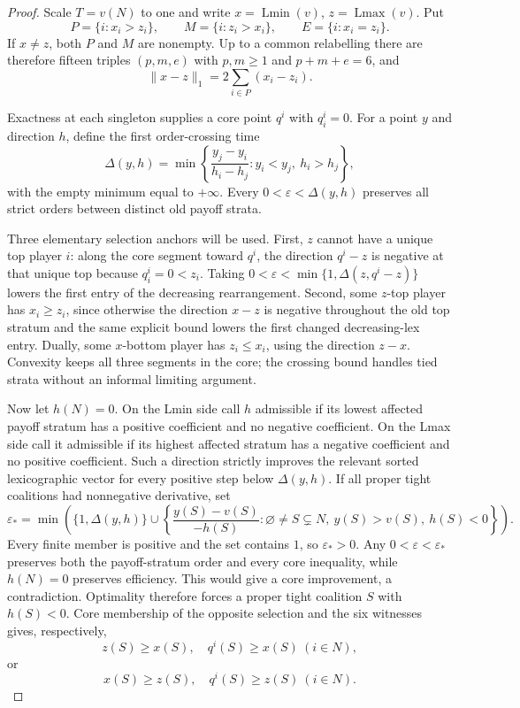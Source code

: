 \documentclass[11pt]{article}
\newcommand{\Lmin}{\operatorname{Lmin}}
\newcommand{\Lmax}{\operatorname{Lmax}}
\begin{document}
\begin{proof}
Scale $T=v(N)$ to one and write $x=\Lmin(v)$, $z=\Lmax(v)$.  Put
\[
 P=\{i:x_i>z_i\},\qquad M=\{i:z_i>x_i\},\qquad E=\{i:x_i=z_i\}.
\]
If $x\ne z$, both $P$ and $M$ are nonempty.  Up to a common relabelling
there are therefore fifteen triples $(p,m,e)$ with $p,m\ge1$ and
$p+m+e=6$, and
\[
 \|x-z\|_1=2\sum_{i\in P}(x_i-z_i).                    \tag{28}
\]

Exactness at each singleton supplies a core point $q^i$ with $q^i_i=0$.
For a point $y$ and direction $h$, define the first order-crossing time
\[
 \Delta(y,h)=\min\left\{\frac{y_j-y_i}{h_i-h_j}:
 y_i<y_j,\ h_i>h_j\right\},
\]
with the empty minimum equal to $+\infty$.  Every
$0<\varepsilon<\Delta(y,h)$ preserves all strict orders between distinct old
payoff strata.

Three elementary selection anchors will be used.  First, $z$ cannot have a
unique top player $i$: along the core segment toward $q^i$, the direction
$q^i-z$ is negative at that unique top because $q^i_i=0<z_i$.  Taking
$0<\varepsilon<\min\{1,\Delta(z,q^i-z)\}$ lowers the first entry of the
decreasing rearrangement.  Second, some $z$-top player has $x_i\ge z_i$,
since otherwise the direction $x-z$ is negative throughout the old top
stratum and the same explicit bound lowers the first changed decreasing-lex
entry.  Dually, some $x$-bottom player has $z_i\le x_i$, using the direction
$z-x$.  Convexity keeps all three segments in the core; the crossing bound
handles tied strata without an informal limiting argument.

Now let $h(N)=0$.  On the Lmin side call $h$ admissible if its lowest affected
payoff stratum has a positive coefficient and no negative coefficient.  On
the Lmax side call it admissible if its highest affected stratum has a
negative coefficient and no positive coefficient.  Such a direction strictly
improves the relevant sorted lexicographic vector for every positive step
below $\Delta(y,h)$.  If all proper tight coalitions had nonnegative
derivative, set
\[
 \varepsilon_*=\min\left(\{1,\Delta(y,h)\}\cup
 \left\{\frac{y(S)-v(S)}{-h(S)}:
 \varnothing\ne S\subsetneq N,\ y(S)>v(S),\ h(S)<0\right\}\right).
\]
Every finite member is positive and the set contains $1$, so
$\varepsilon_*>0$.  Any $0<\varepsilon<\varepsilon_*$ preserves both the
payoff-stratum order and every core inequality, while $h(N)=0$ preserves
efficiency.  This would give a core improvement, a contradiction.  Optimality
therefore forces a proper tight coalition $S$ with $h(S)<0$.  Core membership
of the opposite selection and the six witnesses gives, respectively,
\[
 z(S)\ge x(S),\quad q^i(S)\ge x(S)\ (i\in N),           \tag{29}
\]
or
\[
 x(S)\ge z(S),\quad q^i(S)\ge z(S)\ (i\in N).           \tag{30}
\]


\end{proof}
\end{document}
